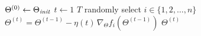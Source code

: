 \documentclass[10pt,oneside]{book}
\begin{document}
\pagestyle{empty}
\thispagestyle{empty}

\begin{codebox}
  \li $\Theta^{(0)} \gets \Theta_{\it init}$
  \li \For $t \gets 1$ \To $T$
  \li \Do 
       randomly select $i \in \{1, 2, \dots, n\}$
  \li   $\Theta^{(t)} = \Theta^{(t-1)} - \eta(t) \, \nabla_\Theta f_i(\Theta^{(t-1)})$
      \End
  \li \Return $\Theta^{(t)}$
\end{codebox}
\end{document}
